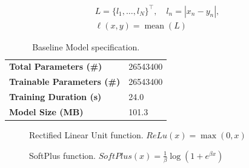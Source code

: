 \begin{gather}\label{eq:l1loss}
	L = \{l_1,\dots,l_N\}^\top, \quad
	l_n = \left| x_n - y_n \right|,\\
	\ell(x,y) = \operatorname{mean}(L)
\end{gather}

\begin{table}[H]
	\begin{center}
		\begin{tabular}[c]{l|l}

			\textbf{Total Parameters (\#)}     & 26543400 \\
			\textbf{Trainable Parameters (\#)} & 26543400 \\
			\textbf{Training Duration (s)}     & 24.0     \\
			\textbf{Model Size (MB)}           & 101.3
		\end{tabular}
	\end{center}
	\caption{Baseline Model specification.}\label{tab:ufcnspecs}
\end{table}

\begin{minipage}[t]{0.5\textwidth}
	\begin{figure}[H]
		\centering
		\caption{Rectified Linear Unit function. $ReLu(x) = \max(0, x)$}
		\label{fig:relu}
	\end{figure}
\end{minipage}%
\hspace{.5cm}
\begin{minipage}[t]{0.5\textwidth}
	\begin{figure}[H]
		\centering
		\caption{SoftPlus function. $SoftPlus(x) = \frac{1}{\beta} \log(1+e^{\beta x})$}
		\label{fig:softplus}
	\end{figure}
\end{minipage}

